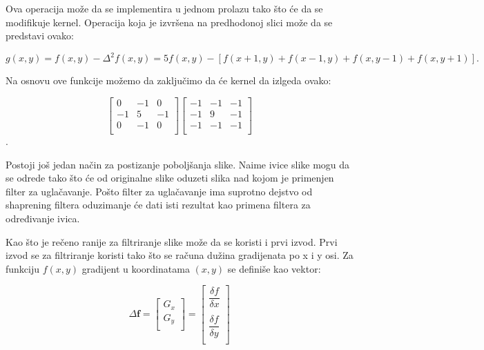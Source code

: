 \documentclass[a4paper,12pt,titlepage]{article}
\begin{document}
Ova operacija može da se implementira u jednom prolazu tako što će da se modifikuje kernel. Operacija koja je izvršena na predhodonoj slici može da se predstavi ovako:

\begin{equation}\label{eq:grad10}
g(x, y) = f(x, y) - \Delta^{2}f(x, y) = 5f(x, y) - [f(x + 1, y) + f(x - 1, y) + f(x, y - 1) + f(x, y + 1)].
\end{equation} 

Na osnovu ove funkcije možemo da zaključimo da će kernel da izlgeda ovako:

\[
\begin{bmatrix}
     0 & -1 & 0 \\
     -1 & 5 & -1 \\
     0 & -1 & 0 \\
\end{bmatrix}
\begin{bmatrix}
     -1 & -1 & -1 \\
     -1 & 9 & -1 \\
     -1 & -1 & -1 \\
\end{bmatrix}
\]. 

Postoji još jedan način za postizanje poboljšanja slike. Naime ivice slike mogu da se odrede tako što će od originalne slike oduzeti slika nad kojom je primenjen filter za uglačavanje. Pošto filter za uglačavanje ima suprotno dejstvo od shaprening filtera oduzimanje će dati isti rezultat kao primena filtera za određivanje ivica. 

Kao što je rečeno ranije za filtriranje slike može da se koristi i prvi izvod. Prvi izvod se za filtriranje koristi tako što se računa dužina gradijenata po x i y osi. Za funkciju $f(x, y)$ gradijent u koordinatama $(x, y)$ se definiše kao vektor:

\begin{equation}\label{eq:grad11}
\Delta \textbf{f}
=
\begin{bmatrix}
     G_{x} \\
     G_{y} \\
\end{bmatrix}
=
\begin{bmatrix}
     \dfrac{\delta f}{\delta x} \\
     \\
     \dfrac{\delta f}{\delta y} \\
\end{bmatrix}
\end{equation}
\end{document}
